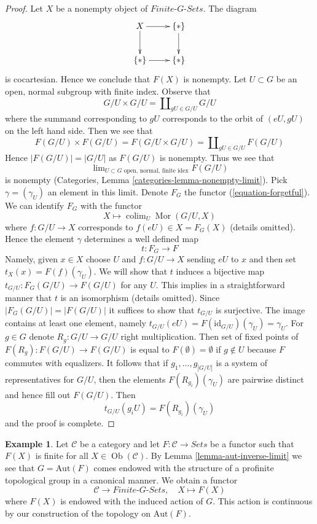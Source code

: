 \documentclass{stacks-project}
\theoremstyle{plain}
\theoremstyle{definition}
\newtheorem{example}[subsection]{Example}
\theoremstyle{remark}
\numberwithin{equation}{subsection}
\def\lim{\mathop{\mathrm{lim}}\nolimits}
\def\colim{\mathop{\mathrm{colim}}\nolimits}
\def\Mor{\mathop{\mathrm{Mor}}\nolimits}
\def\Ob{\mathop{\mathrm{Ob}}\nolimits}
\begin{document}
\begin{proof}
Let $X$ be a nonempty object of $\textit{Finite-}G\textit{-Sets}$.
The diagram
$$
\xymatrix{
X \ar[r] \ar[d] & \{*\} \ar[d] \\
\{*\} \ar[r] & \{*\}
}
$$
is cocartesian. Hence we conclude that $F(X)$ is nonempty.
Let $U \subset G$ be an open, normal subgroup with finite index.
Observe that
$$
G/U \times G/U = \coprod\nolimits_{gU \in G/U} G/U
$$
where the summand corresponding to $gU$ corresponds to the orbit of
$(eU, gU)$ on the left hand side. Then we see that
$$
F(G/U) \times F(G/U) = F(G/U \times G/U) = \coprod\nolimits_{gU \in G/U} F(G/U)
$$
Hence $|F(G/U)| = |G/U|$ as $F(G/U)$ is nonempty. Thus we see that
$$
\lim_{U \subset G\text{ open, normal, finite idex}} F(G/U)
$$
is nonempty (Categories, Lemma \ref{categories-lemma-nonempty-limit}).
Pick $\gamma = (\gamma_U)$ an element in this limit.
Denote $F_G$ the functor (\ref{equation-forgetful}). We can identify
$F_G$ with the functor
$$
X \longmapsto \colim_U \Mor(G/U, X)
$$
where $f : G/U \to X$ corresponds to $f(eU) \in X = F_G(X)$
(details omitted). Hence the element $\gamma$ determines
a well defined map
$$
t : F_G \longrightarrow F
$$
Namely, given $x \in X$ choose $U$ and $f : G/U \to X$ sending
$eU$ to $x$ and then set $t_X(x) = F(f)(\gamma_U)$.
We will show that $t$ induces a bijective map
$t_{G/U} : F_G(G/U) \to F(G/U)$ for any $U$.
This implies in a straightforward manner that $t$
is an isomorphism (details omitted).
Since $|F_G(G/U)| = |F(G/U)|$ it suffices to show
that $t_{G/U}$ is surjective. The image contains at least
one element, namely
$t_{G/U}(eU) = F(\text{id}_{G/U})(\gamma_U) = \gamma_U$.
For $g \in G$ denote $R_g : G/U \to G/U$ right multiplication.
Then set of fixed points of $F(R_g) : F(G/U) \to F(G/U)$
is equal to $F(\emptyset) = \emptyset$ if $g \not \in U$ because $F$
commutes with equalizers. It follows that if
$g_1, \ldots, g_{|G/U|}$ is a system of representatives
for $G/U$, then the elements $F(R_{g_i})(\gamma_U)$ are pairwise distinct
and hence fill out $F(G/U)$. Then
$$
t_{G/U}(g_iU) = F(R_{g_i})(\gamma_U)
$$
and the proof is complete.
\end{proof}

\begin{example}
\label{example-from-C-F-to-G-sets}
Let $\mathcal{C}$ be a category and let $F : \mathcal{C} \to \textit{Sets}$
be a functor such that $F(X)$ is finite for all $X \in \Ob(\mathcal{C})$.
By Lemma \ref{lemma-aut-inverse-limit} we see that $G = \text{Aut}(F)$
comes endowed with the structure of a profinite topological group in a
canonical manner. We obtain a functor
\begin{equation}
\label{equation-remember}
\mathcal{C} \longrightarrow \textit{Finite-}G\textit{-Sets},\quad
X \longmapsto F(X)
\end{equation}
where $F(X)$ is endowed with the induced action of $G$. This action
is continuous by our construction of the topology on $\text{Aut}(F)$.
\end{example}
\end{document}
